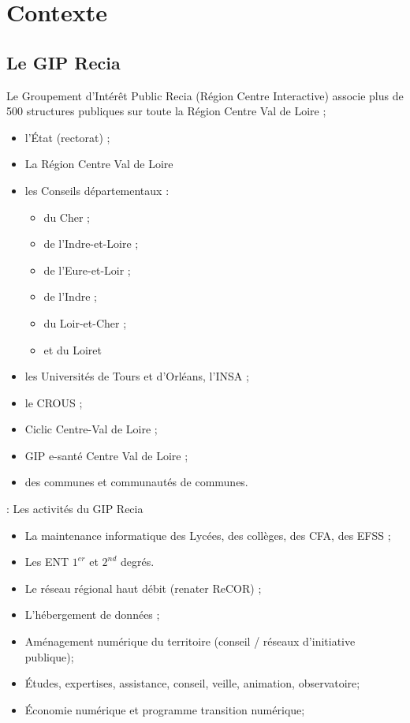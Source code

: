 

\section{Contexte}
\subsection{Le GIP Recia}

 \begin{frame}{\sub}
	Le Groupement d’Intérêt Public Recia (Région Centre Interactive) associe plus de 500 structures publiques sur toute la Région Centre Val de Loire ;
\begin{itemize}
\item l’État (rectorat) ;
\item La Région Centre Val de Loire
\item les Conseils départementaux :
	\begin{itemize}
		\item du Cher ;
		\item de l’Indre-et-Loire ;
		\item de l’Eure-et-Loir ;
		\item de l'Indre ;
		\item du Loir-et-Cher ;
		\item et du Loiret
	\end{itemize}
\item les Universités de Tours et d’Orléans, l’INSA ;
\item le CROUS ;
\item Ciclic Centre-Val de Loire ; 
\item GIP e-santé Centre Val de Loire ; 
\item des communes et communautés de communes.
\end{itemize}

\end{frame}

\begin{frame}{\smallsec: Les activités du GIP Recia }
\begin{itemize}
\item La maintenance informatique des Lycées, des collèges, des CFA, des EFSS ;
\item Les ENT $1^{er}$ et $2^{nd}$ degrés.
\item Le réseau régional haut débit (renater ReCOR) ;
\item L’hébergement de données ;
\item Aménagement numérique du territoire (conseil / réseaux d’initiative publique);
\item Études, expertises, assistance, conseil, veille, animation, observatoire;
\item Économie numérique et programme transition numérique;
\end{itemize}
\end{frame}

